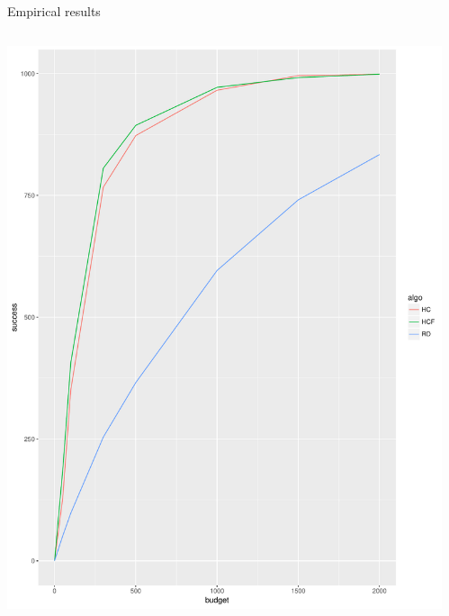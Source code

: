 \documentclass{beamer}
\begin{document}
\begin{frame}{Empirical results}
\begin{columns}
\begin{column}{0.5\textwidth}
    \begin{center}
        \includegraphics[scale=0.25]{success_f_budget.pdf}
    \end{center}
\end{column}
\begin{column}{0.5\textwidth}
    \begin{center}

\end{center}
\end{column}
\end{columns}
\end{frame}
\end{document}
